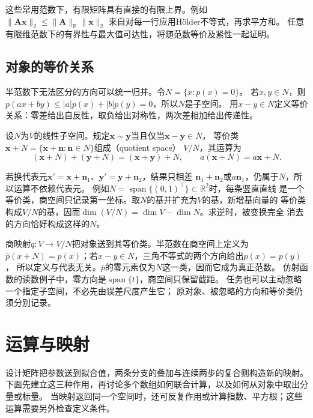 这些常用范数下，有限矩阵具有直接的有限上界。例如
$\lVert\bm A\bm x\rVert_2\leq\lVert\bm A\rVert_{\mathrm F}\lVert\bm x\rVert_2$
来自对每一行应用Hölder不等式，再求平方和。
任意有限维范数下的有界性与最大值可达性，将随范数等价及紧性一起证明。

\subsection{对象的等价关系}
\label{sec:linear-algebra-equivalence-relations}

半范数下无法区分的方向可以统一归并。令$N=\{x:p(x)=0\}$。
若$x,y\in N$，则$p(ax+by)\leq |a|p(x)+|b|p(y)=0$，所以$N$是子空间。
用$x-y\in N$定义等价关系：零差给出自反性，取负给出对称性，两次差相加给出传递性。
\begin{definition}[线性空间的商空间]
\label{def:linear-algebra-quotient-space}
设$N$为$V$的线性子空间。规定$\bm x\sim\bm y$当且仅当$\bm x-\bm y\in N$，
等价类$\bm x+N=\{\bm x+\bm n:\bm n\in N\}$组成（quotient space）
$V/N$，其运算为
\[
 (\bm x+N)+(\bm y+N)=(\bm x+\bm y)+N,\qquad
 a(\bm x+N)=a\bm x+N.
\]
\end{definition}
若换代表元$\bm x'=\bm x+\bm n_1$、$\bm y'=\bm y+\bm n_2$，结果只相差
$\bm n_1+\bm n_2$或$a\bm n_1$，仍属于$N$，所以运算不依赖代表元。
例如$N=\operatorname{span}\{(0,1)^{\top}\}\subset\mathbb R^2$时，每条竖直直线
是一个等价类，商空间只记录第一坐标。取$N$的基并扩充为$V$的基，新增基向量的
等价类构成$V/N$的基，因而$\dim(V/N)=\dim V-\dim N$。求逆时，被变换完全
消去的方向恰好构成这样的$N$。



商映射$q:V\to V/N$把对象送到其等价类。半范数在商空间上定义为
$\bar p(x+N)=p(x)$；若$x-y\in N$，三角不等式的两个方向给出$p(x)=p(y)$，
所以定义与代表无关。$\bar p$的零元素仅为$N$这一类，因而它成为真正范数。
仿射函数的读数例子中，零方向是$\operatorname{span}\{t\}$，商空间只保留截距。
任务也可以主动忽略一个指定子空间，不必先由误差尺度产生它；
原对象、被忽略的方向和等价类仍须分别记录。

\section{运算与映射}
\label{sec:linear-algebra-matrices-linear-maps}

设计矩阵把参数送到拟合值，两条分支的叠加与连续两步的复合则构造新的映射。
下面先建立这三种作用，再讨论多个数组如何联合计算，以及如何从对象中取出分量或标量。
当映射返回同一个空间时，还可反复作用或计算指数、平方根；这些运算需要另外检查定义条件。

